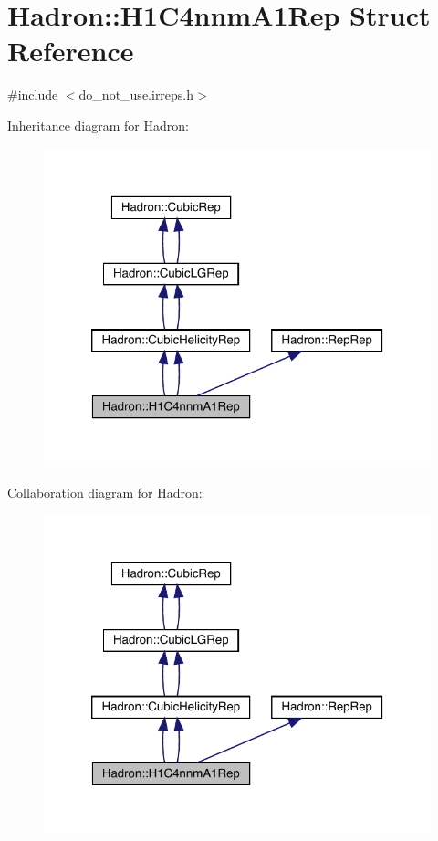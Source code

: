 \hypertarget{structHadron_1_1H1C4nnmA1Rep}{}\section{Hadron\+:\+:H1\+C4nnm\+A1\+Rep Struct Reference}
\label{structHadron_1_1H1C4nnmA1Rep}


{\ttfamily \#include $<$do\+\_\+not\+\_\+use.\+irreps.\+h$>$}



Inheritance diagram for Hadron\+:\nopagebreak
\begin{figure}[H]
\begin{center}
\leavevmode
\includegraphics[width=320pt]{de/d8a/structHadron_1_1H1C4nnmA1Rep__inherit__graph}
\end{center}
\end{figure}


Collaboration diagram for Hadron\+:\nopagebreak
\begin{figure}[H]
\begin{center}
\leavevmode
\includegraphics[width=320pt]{da/dd5/structHadron_1_1H1C4nnmA1Rep__coll__graph}
\end{center}
\end{figure}
